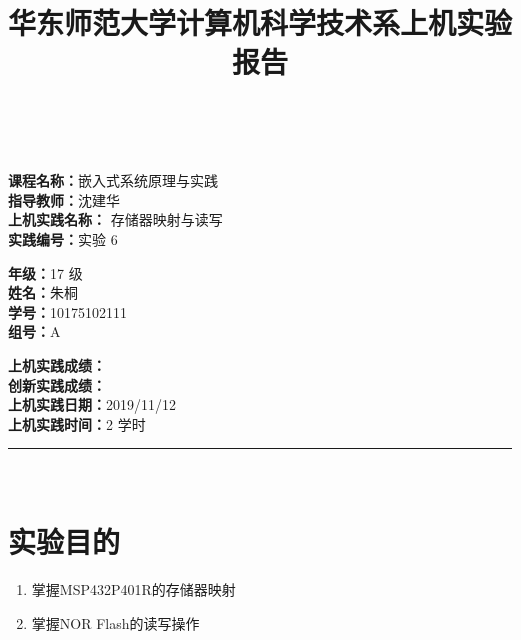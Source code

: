 \documentclass[a4paper,10pt,UTF8]{paper}
\title{华东师范大学计算机科学技术系上机实验报告}
\numberwithin{equation}{section}
\numberwithin{figure}{section}
\begin{document}
\pagestyle{fancy}
\lhead{}
\rhead{}
\makeatletter
\def\headrule{{\if@fancyplain\let\headrulewidth\plainheadrulewidth\fi%
\color{gray}\hrule\@height 0.2pt\@width\headwidth}
  \vspace{6mm}}
\makeatother

\newcommand{\HRule}{\rule{\linewidth}{1mm}}
\newcommand{\dai}{\textbf{Dais-CMX16$^+$}}

{ \\ [0.8cm]

\small{
  \begin{minipage}[t]{.32\linewidth}
    \textbf{课程名称：}嵌入式系统原理与实践\\
    \textbf{指导教师：}沈建华\\
    \textbf{上机实践名称：} 存储器映射与读写\\
    \textbf{实践编号：}实验 6
  \end{minipage}
  \begin{minipage}[t]{.32\linewidth}
    \textbf{年级：}17 级\\
    \textbf{姓名：}朱桐\\
    \textbf{学号：}10175102111\\
    \textbf{组号：}A
  \end{minipage} 
  \begin{minipage}[t]{.32\linewidth}
    \textbf{上机实践成绩：} \\
    \textbf{创新实践成绩：} \\
    \textbf{上机实践日期：}2019/11/12\\
    \textbf{上机实践时间：}2 学时\\
  \end{minipage}
}
\HRule \\[0.5cm]
}


\section{实验目的}

\begin{enumerate}
    \item 掌握MSP432P401R的存储器映射
    \item 掌握NOR Flash的读写操作
\end{enumerate}
\end{document}
